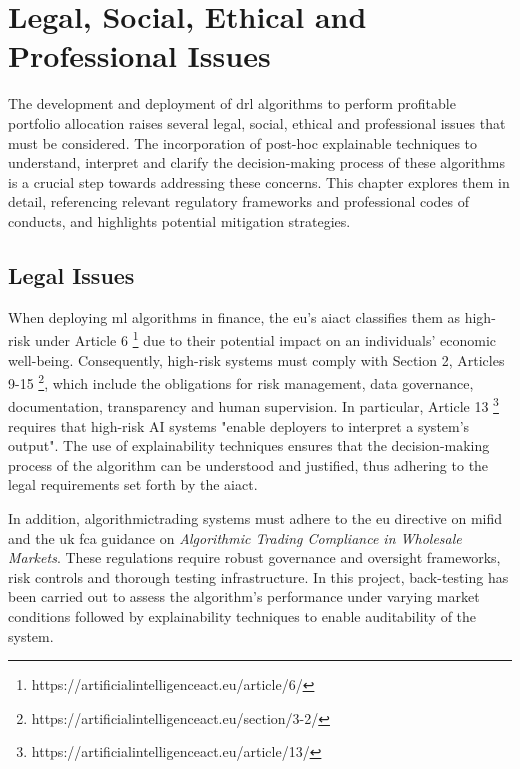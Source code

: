 \chapter{Legal, Social, Ethical and Professional Issues} \label{ch:issues}

The development and deployment of \acrfull{drl} algorithms to perform profitable portfolio allocation raises several legal, social, ethical and professional issues that must be considered. The incorporation of post-hoc explainable techniques to understand, interpret and clarify the decision-making process of these algorithms is a crucial step towards addressing these concerns. This chapter explores them in detail, referencing relevant regulatory frameworks and professional codes of conducts, and highlights potential mitigation strategies.

\section{Legal Issues} \label{sec:legal-issues}

When deploying \acrfull{ml} algorithms in finance, the \acrfull{eu}'s \acrfull{aiact} \cite{AIAct2024} classifies them as high-risk under Article 6 \footnote{https://artificialintelligenceact.eu/article/6/} due to their potential impact on an individuals' economic well-being. Consequently, high-risk systems must comply with Section 2, Articles 9-15 \footnote{https://artificialintelligenceact.eu/section/3-2/}, which include the obligations for risk management, data governance, documentation, transparency and human supervision. In particular, Article 13 \footnote{https://artificialintelligenceact.eu/article/13/} requires that high-risk AI systems "enable deployers to interpret a system's output". The use of explainability techniques ensures that the decision-making process of the algorithm can be understood and justified, thus adhering to the legal requirements set forth by the \acrshort{aiact}.

In addition, \Gls{algorithmictrading} systems must adhere to the \acrlong{eu} directive on \acrfull{mifid} \cite{MiFIDII} and the \acrlong{uk} \acrfull{fca} guidance on \textit{Algorithmic Trading Compliance in Wholesale Markets}. These regulations require robust governance and oversight frameworks, risk controls and thorough testing infrastructure. In this project, back-testing has been carried out to assess the algorithm's performance under varying market conditions followed by explainability techniques to enable auditability of the system.

